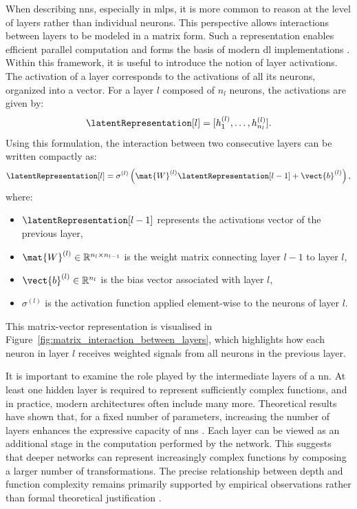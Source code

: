 When describing \glspl{nn}, especially in \glspl{mlp}, it is more common to reason at the level of layers rather than individual neurons.
This perspective allows interactions between layers to be modeled in a matrix form.
Such a representation enables efficient parallel computation and forms the basis of modern \gls{dl} implementations \parencite{krizhevsky2012imagenet}.
Within this framework, it is useful to introduce the notion of layer activations.
The activation of a layer corresponds to the activations of all its neurons, organized into a vector.
For a layer $l$ composed of $n_l$ neurons, the activations are given by:
\begin{equation}
\latentRepresentation[l] = [h_1^{(l)}, \dots, h_{n_l}^{(l)}].
\label{eq:layer_activation_vector}
\end{equation}
Using this formulation, the interaction between two consecutive layers can be written compactly as:
\begin{equation}
\latentRepresentation[l] = \sigma^{(l)}\left(\mat{W}^{(l)} \latentRepresentation[l-1] + \vect{b}^{(l)}\right),
\label{eq:layer_interaction}
\end{equation}
where:
\begin{itemize}
\item $\latentRepresentation[l-1]$ represents the activations vector of the previous layer,
\item $\mat{W}^{(l)} \in \mathbb{R}^{n_l \times n_{l-1}}$ is the weight matrix connecting layer $l-1$ to layer $l$,
\item $\vect{b}^{(l)} \in \mathbb{R}^{n_l}$ is the bias vector associated with layer $l$,
\item $\sigma^{(l)}$ is the activation function applied element-wise to the neurons of layer $l$.
\end{itemize}

This matrix-vector representation is visualised in Figure~\ref{fig:matrix_interaction_between_layers}, which highlights how each neuron in layer $l$ receives weighted signals from all neurons in the previous layer.



It is important to examine the role played by the intermediate layers of a \gls{nn}.
At least one hidden layer is required to represent sufficiently complex functions, and in practice, modern architectures often include many more.
Theoretical results have shown that, for a fixed number of parameters, increasing the number of layers enhances the expressive capacity of \glspl{nn} \parencite{telgarsky2016benefits}.
Each layer can be viewed as an additional stage in the computation performed by the network.
This suggests that deeper networks can represent increasingly complex functions by composing a larger number of transformations.
The precise relationship between depth and function complexity remains primarily supported by empirical observations rather than formal theoretical justification \parencite{goodfellow2016deep}.

